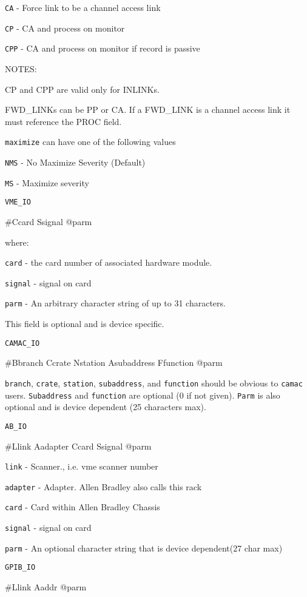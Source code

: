 \verb|CA| - Force link to be a channel access link

\verb|CP| - CA and process on monitor

\verb|CPP| - CA and process on monitor if record is passive

NOTES:

CP and CPP are valid only for INLINKs.

FWD\_LINKs can be PP or CA. If a FWD\_LINK is a channel access link it must reference the 
PROC field.

\verb|maximize| can have one of the following values

\verb|NMS| - No Maximize Severity (Default)

\verb|MS| - Maximize severity

\verb|VME_IO|

\#Ccard Ssignal @parm

where:

 \verb|card| - the card number of associated hardware module.

 \verb|signal| - signal on card

 \verb|parm| - An arbitrary character string of up to 31 characters.

                This field is optional and is device specific.

\verb|CAMAC_IO|

\#Bbranch Ccrate Nstation Asubaddress Ffunction @parm

\verb|branch|, \verb|crate|, \verb|station|, \verb|subaddress|, and \verb|function| should be obvious to \verb|camac| users. 
\verb|Subaddress| and \verb|function| are optional (0 if not given). \verb|Parm| is also optional and is device 
dependent (25 characters max).

\verb|AB_IO|

\#Llink Aadapter Ccard Ssignal @parm

\verb|link| - Scanner., i.e. vme scanner number

\verb|adapter| - Adapter. Allen Bradley also calls this rack

\verb|card| - Card within Allen Bradley Chassis

\verb|signal| - signal on card

\verb|parm| - An optional character string that is device dependent(27 char max)

\verb|GPIB_IO|

\#Llink Aaddr @parm

